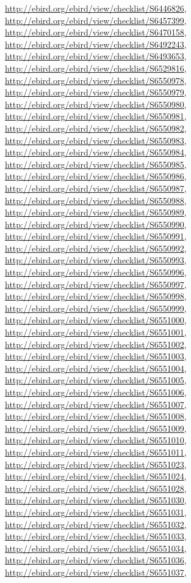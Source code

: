 \documentclass[9pt, article]{memoir}
\begin{document}
\begin{multicols}{2}
\url{http://ebird.org/ebird/view/checklist/S6446826}, 
\url{http://ebird.org/ebird/view/checklist/S6457399}, 
\url{http://ebird.org/ebird/view/checklist/S6470158}, 
\url{http://ebird.org/ebird/view/checklist/S6492243}, 
\url{http://ebird.org/ebird/view/checklist/S6493653}, 
\url{http://ebird.org/ebird/view/checklist/S6529816}, 
\url{http://ebird.org/ebird/view/checklist/S6550978}, 
\url{http://ebird.org/ebird/view/checklist/S6550979}, 
\url{http://ebird.org/ebird/view/checklist/S6550980}, 
\url{http://ebird.org/ebird/view/checklist/S6550981}, 
\url{http://ebird.org/ebird/view/checklist/S6550982}, 
\url{http://ebird.org/ebird/view/checklist/S6550983}, 
\url{http://ebird.org/ebird/view/checklist/S6550984}, 
\url{http://ebird.org/ebird/view/checklist/S6550985}, 
\url{http://ebird.org/ebird/view/checklist/S6550986}, 
\url{http://ebird.org/ebird/view/checklist/S6550987}, 
\url{http://ebird.org/ebird/view/checklist/S6550988}, 
\url{http://ebird.org/ebird/view/checklist/S6550989}, 
\url{http://ebird.org/ebird/view/checklist/S6550990}, 
\url{http://ebird.org/ebird/view/checklist/S6550991}, 
\url{http://ebird.org/ebird/view/checklist/S6550992}, 
\url{http://ebird.org/ebird/view/checklist/S6550993}, 
\url{http://ebird.org/ebird/view/checklist/S6550996}, 
\url{http://ebird.org/ebird/view/checklist/S6550997}, 
\url{http://ebird.org/ebird/view/checklist/S6550998}, 
\url{http://ebird.org/ebird/view/checklist/S6550999}, 
\url{http://ebird.org/ebird/view/checklist/S6551000}, 
\url{http://ebird.org/ebird/view/checklist/S6551001}, 
\url{http://ebird.org/ebird/view/checklist/S6551002}, 
\url{http://ebird.org/ebird/view/checklist/S6551003}, 
\url{http://ebird.org/ebird/view/checklist/S6551004}, 
\url{http://ebird.org/ebird/view/checklist/S6551005}, 
\url{http://ebird.org/ebird/view/checklist/S6551006}, 
\url{http://ebird.org/ebird/view/checklist/S6551007}, 
\url{http://ebird.org/ebird/view/checklist/S6551008}, 
\url{http://ebird.org/ebird/view/checklist/S6551009}, 
\url{http://ebird.org/ebird/view/checklist/S6551010}, 
\url{http://ebird.org/ebird/view/checklist/S6551011}, 
\url{http://ebird.org/ebird/view/checklist/S6551023}, 
\url{http://ebird.org/ebird/view/checklist/S6551024}, 
\url{http://ebird.org/ebird/view/checklist/S6551028}, 
\url{http://ebird.org/ebird/view/checklist/S6551030}, 
\url{http://ebird.org/ebird/view/checklist/S6551031}, 
\url{http://ebird.org/ebird/view/checklist/S6551032}, 
\url{http://ebird.org/ebird/view/checklist/S6551033}, 
\url{http://ebird.org/ebird/view/checklist/S6551034}, 
\url{http://ebird.org/ebird/view/checklist/S6551036}, 
\url{http://ebird.org/ebird/view/checklist/S6551037}, 

\end{multicols}
\end{document}
